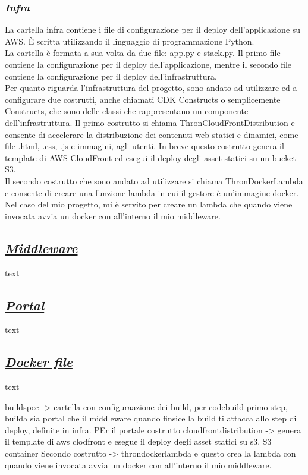 \subsubsection*{\normalsize\textit{\uline{Infra}}}
La cartella infra contiene i file di configurazione per il deploy dell'applicazione su AWS. È scritta utilizzando il linguaggio di programmazione Python.\\
La cartella è formata a sua volta da due file: app.py e stack.py. Il primo file contiene la configurazione per il deploy dell'applicazione, mentre il secondo file contiene la configurazione per il deploy dell'infrastruttura.\\
Per quanto riguarda l'infrastruttura del progetto, sono andato ad utilizzare ed a configurare due costrutti, anche chiamati CDK Constructs o semplicemente Constructs, che sono delle classi che rappresentano un componente dell'infrastruttura.
Il primo costrutto si chiama ThronCloudFrontDistribution e consente di accelerare la distribuzione dei contenuti web statici e dinamici, come file .html, .css, .js e immagini, agli utenti.
In breve questo costrutto genera il template di AWS CloudFront ed esegui il deploy degli asset statici su un bucket S3.\\
Il secondo costrutto che sono andato ad utilizzare si chiama ThronDockerLambda e consente di creare una funzione lambda in cui il gestore è un'immagine docker.
Nel caso del mio progetto, mi è servito per creare un lambda che quando viene invocata avvia un docker con all'interno il mio middleware.\\

\subsection*{\normalsize\textit{\uline{Middleware}}}
text

\subsection*{\normalsize\textit{\uline{Portal}}}
text

\subsection*{\normalsize\textit{\uline{Docker file}}}
text

buildspec -> cartella con configuraazione dei build, per codebuild primo step, builda sia portal che il middleware
quando finsice la build ti attacca allo step di deploy, definite in infra. 
PEr il portale costrutto cloudfrontdistribution -> genera il template di aws clodfront e esegue il deploy degli asset statici su s3. S3 container
Secondo costrutto -> throndockerlambda e questo crea la lambda con quando viene invocata avvia un docker con all'interno il mio middleware.










